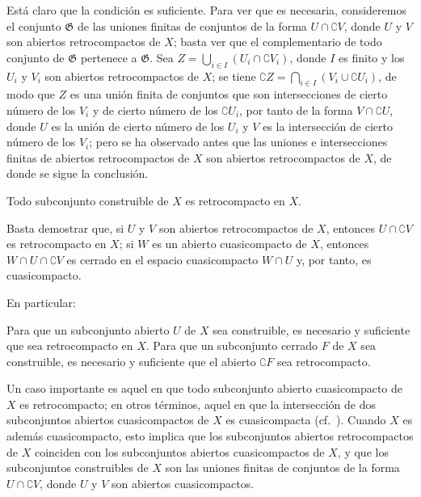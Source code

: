 Está claro que la condición es suficiente.
Para ver que es necesaria, consideremos el conjunto $\mathfrak{G}$ de las uniones finitas de conjuntos de la forma $U\cap\complement{V}$, donde $U$ y $V$ son abiertos retrocompactos de $X$; basta ver que el complementario de todo conjunto de $\mathfrak{G}$ pertenece a $\mathfrak{G}$.
Sea $Z=\bigcup_{i\in I}(U_i\cap\complement{V_i})$, donde $I$ es finito y los $U_i$ y $V_i$ son abiertos retrocompactos de $X$; se tiene
$\complement{Z}=\bigcap_{i\in I}(V_i\cup\complement{U_i})$, de modo que $Z$ es una unión finita de conjuntos que son intersecciones de cierto número de los $V_i$ y de cierto número de los $\complement{U_i}$, por tanto de la forma
$V\cap\complement{U}$, donde $U$ es la unión de cierto número de los $U_i$ y $V$ es la intersección de cierto número de los $V_i$; pero se ha observado antes que las uniones e intersecciones finitas de abiertos retrocompactos de $X$ son abiertos retrocompactos de $X$, de donde se sigue la conclusión.


\begin{corollary}[9.1.4]
\label{0.9.1.4}
\label{0.9.1.4-fr}
Todo subconjunto construible de $X$ es retrocompacto en $X$.
\end{corollary}


Basta demostrar que, si $U$ y $V$ son abiertos retrocompactos de $X$, entonces $U\cap\complement{V}$ es retrocompacto en $X$; si $W$ es un abierto cuasicompacto de $X$, entonces $W\cap U\cap\complement{V}$ es cerrado en el espacio cuasicompacto $W\cap U$ y, por tanto, es cuasicompacto.


En particular:
\begin{corollary}[9.1.5]
\label{0.9.1.5}
\label{0.9.1.5-fr}
Para que un subconjunto abierto $U$ de $X$ sea construible, es necesario y suficiente que sea retrocompacto en $X$.
Para que un subconjunto cerrado $F$ de $X$ sea construible, es necesario y suficiente que el abierto $\complement{F}$ sea retrocompacto.
\end{corollary}

\begin{env}[9.1.6]
\label{0.9.1.6}
\label{0.9.1.6-fr}
Un caso importante es aquel en que todo subconjunto abierto cuasicompacto de $X$ es retrocompacto; en otros términos, aquel en que la intersección de dos subconjuntos abiertos cuasicompactos de $X$ es cuasicompacta (cf.~).
Cuando $X$ es además cuasicompacto, esto implica que los subconjuntos abiertos retrocompactos de $X$ coinciden con los subconjuntos abiertos cuasicompactos de $X$, y que los subconjuntos construibles de $X$ son las uniones finitas de conjuntos de la forma $U\cap\complement{V}$, donde $U$ y $V$ son abiertos cuasicompactos.
\end{env}

